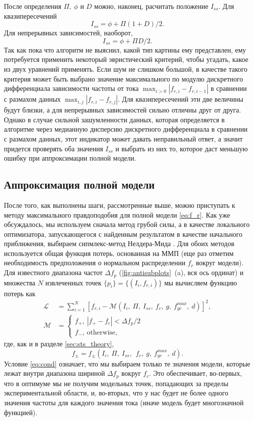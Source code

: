 \documentclass[14pt, a4paper]{extreport}
\numberwithin{equation}{section}
\begin{document}
После определения $\Pi,\ \phi$ и $D$ можно, наконец, расчитать положение $I_{ss}$. Для квазипересечений
\begin{equation}
	I_{ss} = \phi + \Pi (1+D)/2.
\end{equation}
Для непрерывных зависимостей, наоборот,
\begin{equation}
	I_{ss} = \phi + \Pi D/2.
\end{equation}
Так как пока что алгоритм не выяснил, какой тип картины ему представлен, ему потребуется применить некоторый эвристический критерий, чтобы угадать, какое из двух уравнений применять. Если шум не слишком большой, в качестве такого критерия может быть выбрано значение максимального по модулю дискретного дифференциала зависимости частоты от тока $\max_{i>0} | f_{r,i} - f_{r,i-1} |$ в сравнении с размахом данных $\max_{i,j} |f_{r,i} - f_{r,j}|$. Для квазипересечений эти две величины будут близки, а для непрерывных зависимостей сильно отличны друг от друга. Однако в случае сильной зашумленности данных, которая определяется в алгоритме через медианную дисперсию дискретного дифференциала в сравнении с размахом данных, этот индикатор может давать неправильный ответ, а значит придется проверять оба значения $I_{ss}$ и выбрать из них то, которое даст меньшую ошибку при аппроксимации полной модели.

\subsection{Аппроксимация полной модели}

После того, как выполнены шаги, рассмотренные выше, можно приступать к методу максимального правдоподобия для полной модели \eqref{eq:f_r}. Как уже обсуждалось, мы используем сначала метод грубой силы, а в качестве локального оптимизатора, запускающегося с найденным результатом в качестве начального приближения, выбираем сипмлекс-метод Нелдера-Мида \cite{nelder1965}. Для обоих методов используется общая функция потерь, основанная на ММП (еще раз отметим необходимость предположения о нормальном распределении $f_r$ вокруг модели). Для известного диапазона частот $\Delta f_p$ (\autoref{fig:antisubplots}~(a), вся ось ординат) и множества $N$ извлеченных точек $\{p_i\} = \{(I_i, f_{r,i})\}$ мы вычисляем функцию потерь как
\begin{align}
\mathcal{L} &= \sum_{i=1}^N [f_{r,i} - \mathcal{M}(I_i,\ \Pi, \ I_{ss},\ f_c,\ g,\ f_{ge}^{max},\ d)]^2,\label{eq:loss}\\
\mathcal{M} &= \begin{cases}
f_+,\  |f_+ - f_c|< \Delta f_p/2 \\
f_-,\ \text{otherwise}, \label{eq:cond}
\end{cases}
\end{align}
где, как и в разделе \ref{sec:sts_theory},
\[
f_{\pm} = f_{\pm}(I_i,\ \Pi,\ I_{ss},\ \ f_c,\ g,\ f_{ge}^{max},\ d).
\]
Условие \eqref{eq:cond} означает, что мы выбираем только те значения модели, которые лежат внутри диапазона шириной $\Delta f_p$ вокруг $f_c$. Это обеспечивает, во-первых, что в оптимуме мы не получим модельных точек, попадающих за пределы экспериментальной области, и, во-вторых, что у нас будет не более одного значения частоты для каждого значения тока (иначе модель будет многозначной функцией).
\end{document}

